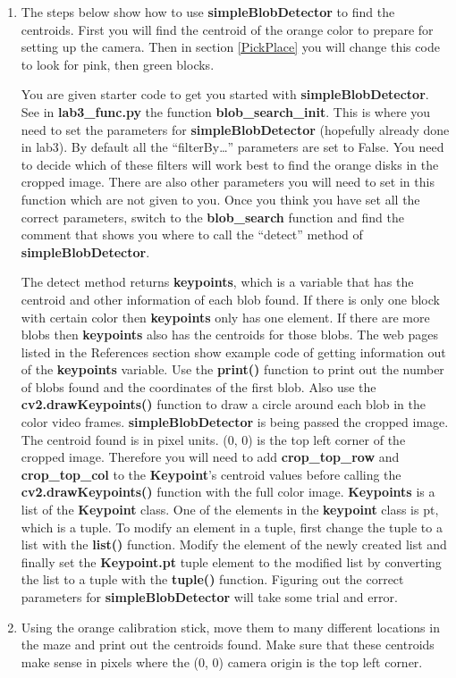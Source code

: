 \begin{enumerate}

\item The steps below show how to use \textbf{simpleBlobDetector} to find the centroids. First you will find the centroid of the orange color to prepare for setting up the camera. Then in section \ref{PickPlace} you will change this code to look for pink, then green blocks.

You are given starter code to get you started with \textbf{simpleBlobDetector}.  See in \textbf{lab3\_func.py} the function \textbf{blob\_search\_init}.  This is where you need to set the parameters for \textbf{simpleBlobDetector} (hopefully already done in lab3).  By default all the “filterBy…” parameters are set to False.  You need to decide which of these filters will work best to find the orange disks in the cropped image.  There are also other parameters you will need to set in this function which are not given to you.  Once you think you have set all the correct parameters, switch to the \textbf{blob\_search} function and find the comment that shows you where to call the “detect” method of \textbf{simpleBlobDetector}.  

The detect method returns \textbf{keypoints}, which is a variable that has the centroid and other information of each blob found.  If there is only one block with certain color then \textbf{keypoints} only has one element.  If there are more blobs then \textbf{keypoints} also has the centroids for those blobs.  The web pages listed in the References section show example code of getting information out of the \textbf{keypoints} variable.  Use the \textbf{print()} function to print out the number of blobs found and the coordinates of the first blob.  Also use the \textbf{cv2.drawKeypoints()} function to draw a circle around each blob in the color video frames. \textbf{simpleBlobDetector} is being passed the cropped image.  The centroid found is in pixel units.  (0, 0) is the top left corner of the cropped image.  Therefore you will need to add \textbf{crop\_top\_row} and \textbf{crop\_top\_col} to the \textbf{Keypoint}'s centroid values before calling the \textbf{cv2.drawKeypoints()} function with the full color image.  \textbf{Keypoints} is a list of the \textbf{Keypoint} class.  One of the elements in the \textbf{keypoint} class is pt, which is a tuple.  To modify an element in a tuple, first change the tuple to a list with the \textbf{list()} function.  Modify the element of the newly created list and finally set the \textbf{Keypoint.pt} tuple element to the modified list by converting the list to a tuple with the \textbf{tuple()} function. Figuring out the correct parameters for \textbf{simpleBlobDetector} will take some trial and error.

\item Using the orange calibration stick, move them to many different locations in the maze and print out the centroids found.  Make sure that these centroids make sense in pixels where the (0, 0) camera origin is the top left corner. 

\end{enumerate}


